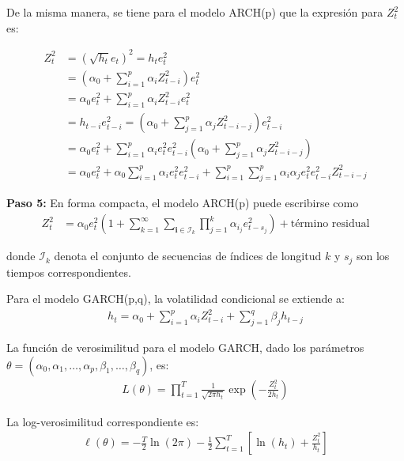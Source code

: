 De la misma manera, se tiene para el modelo ARCH(p) que la expresión para $Z_t^2$ es:

\begin{align*}
    Z_t^2 &= \left(\sqrt{h_t} e_t\right)^2 = h_t e_t^2\\
    &= \left(\alpha_0 + \sum_{i=1}^{p} \alpha_i Z_{t-i}^2\right) e_t^2\\
    &= \alpha_0 e_t^2 + \sum_{i=1}^{p} \alpha_i Z_{t-i}^2 e_t^2\\
    &= h_{t-i} e_{t-i}^2 = \left(\alpha_0 + \sum_{j=1}^{p} \alpha_j Z_{t-i-j}^2\right) e_{t-i}^2\\
    &= \alpha_0 e_t^2 + \sum_{i=1}^{p} \alpha_i e_t^2 e_{t-i}^2 \left(\alpha_0 + \sum_{j=1}^{p} \alpha_j Z_{t-i-j}^2\right)\\
    &= \alpha_0 e_t^2 + \alpha_0 \sum_{i=1}^{p} \alpha_i e_t^2 e_{t-i}^2 + \sum_{i=1}^{p} \sum_{j=1}^{p} \alpha_i \alpha_j e_t^2 e_{t-i}^2 Z_{t-i-j}^2
\end{align*}


\textbf{Paso 5:} En forma compacta, el modelo ARCH(p) puede escribirse como
\begin{align*}
    Z_t^2 &= \alpha_0 e_t^2 \left(1 + \sum_{k=1}^{\infty} \sum_{\mathbf{i} \in \mathcal{I}_k} \prod_{j=1}^{k} \alpha_{i_j} e_{t-s_j}^2\right) + \text{término residual}
\end{align*}

donde $\mathcal{I}_k$ denota el conjunto de secuencias de índices de longitud $k$ y $s_j$ son los tiempos correspondientes.

Para el modelo GARCH(p,q), la volatilidad condicional se extiende a:
\begin{align*}
    h_t = \alpha_0 + \sum_{i=1}^{p} \alpha_i Z_{t-i}^2 + \sum_{j=1}^{q} \beta_j h_{t-j}
\end{align*}

La función de verosimilitud para el modelo GARCH, dado los parámetros $\theta = (\alpha_0, \alpha_1, \ldots, \alpha_p, \beta_1, \ldots, \beta_q)$, es:
\begin{align*}
    L(\theta) = \prod_{t=1}^{T} \frac{1}{\sqrt{2\pi h_t}} \exp\left(-\frac{Z_t^2}{2h_t}\right)
\end{align*}

La log-verosimilitud correspondiente es:
\begin{align*}
    \ell(\theta) = -\frac{T}{2}\ln(2\pi) - \frac{1}{2}\sum_{t=1}^{T}\left[\ln(h_t) + \frac{Z_t^2}{h_t}\right]
\end{align*} 